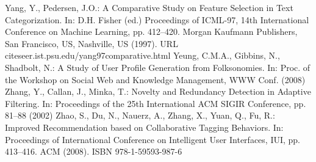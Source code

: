 \begin{thebibliography}{110}
Yang, Y., Pedersen, J.O.: A Comparative Study on Feature Selection in Text Categorization. In: D.H. Fisher (ed.) Proceedings of ICML-97, 14th International Conference on Machine Learning, pp. 412–420. Morgan Kaufmann Publishers, San Francisco, US, Nashville, US (1997). URL citeseer.ist.psu.edu/yang97comparative.html
Yeung, C.M.A., Gibbins, N., Shadbolt, N.: A Study of User Profile Generation from Folksonomies. In: Proc. of the Workshop on Social Web and Knowledge Management, WWW Conf. (2008)
Zhang, Y., Callan, J., Minka, T.: Novelty and Redundancy Detection in Adaptive Filtering. In: Proceedings of the 25th International ACM SIGIR Conference, pp. 81–88 (2002)
Zhao, S., Du, N., Nauerz, A., Zhang, X., Yuan, Q., Fu, R.: Improved Recommendation based on Collaborative Tagging Behaviors. In: Proceedings of International Conference on Intelligent User Interfaces, IUI, pp. 413–416. ACM (2008). ISBN 978-1-59593-987-6
\end{thebibliography}
